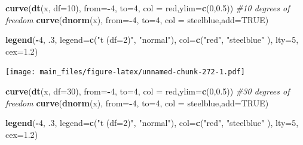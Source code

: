 \documentclass[
]{book}
\newenvironment{Shaded}{\begin{snugshade}}{\end{snugshade}}
\newcommand{\AttributeTok}[1]{\textcolor[rgb]{0.13,0.29,0.53}{#1}}
\newcommand{\CommentTok}[1]{\textcolor[rgb]{0.56,0.35,0.01}{\textit{#1}}}
\newcommand{\ConstantTok}[1]{\textcolor[rgb]{0.56,0.35,0.01}{#1}}
\newcommand{\DecValTok}[1]{\textcolor[rgb]{0.00,0.00,0.81}{#1}}
\newcommand{\FloatTok}[1]{\textcolor[rgb]{0.00,0.00,0.81}{#1}}
\newcommand{\FunctionTok}[1]{\textcolor[rgb]{0.13,0.29,0.53}{\textbf{#1}}}
\newcommand{\NormalTok}[1]{#1}
\newcommand{\SpecialCharTok}[1]{\textcolor[rgb]{0.81,0.36,0.00}{\textbf{#1}}}
\newcommand{\StringTok}[1]{\textcolor[rgb]{0.31,0.60,0.02}{#1}}
\begin{document}
\begin{Shaded}
\begin{Highlighting}[]
\FunctionTok{curve}\NormalTok{(}\FunctionTok{dt}\NormalTok{(x, }\AttributeTok{df=}\DecValTok{10}\NormalTok{), }\AttributeTok{from=}\SpecialCharTok{{-}}\DecValTok{4}\NormalTok{, }\AttributeTok{to=}\DecValTok{4}\NormalTok{, }\AttributeTok{col =} \StringTok{\textquotesingle{}red\textquotesingle{}}\NormalTok{,}\AttributeTok{ylim=}\FunctionTok{c}\NormalTok{(}\DecValTok{0}\NormalTok{,}\FloatTok{0.5}\NormalTok{)) }\CommentTok{\#10 degrees of freedom}
\FunctionTok{curve}\NormalTok{(}\FunctionTok{dnorm}\NormalTok{(x), }\AttributeTok{from=}\SpecialCharTok{{-}}\DecValTok{4}\NormalTok{, }\AttributeTok{to=}\DecValTok{4}\NormalTok{, }\AttributeTok{col =} \StringTok{\textquotesingle{}steelblue\textquotesingle{}}\NormalTok{,}\AttributeTok{add=}\ConstantTok{TRUE}\NormalTok{) }

\FunctionTok{legend}\NormalTok{(}\SpecialCharTok{{-}}\DecValTok{4}\NormalTok{, .}\DecValTok{3}\NormalTok{, }\AttributeTok{legend=}\FunctionTok{c}\NormalTok{(}\StringTok{"t (df=2)"}\NormalTok{, }\StringTok{"normal"}\NormalTok{),}
       \AttributeTok{col=}\FunctionTok{c}\NormalTok{(}\StringTok{"red"}\NormalTok{, }\StringTok{"steelblue"}\NormalTok{ ), }\AttributeTok{lty=}\DecValTok{5}\NormalTok{, }\AttributeTok{cex=}\FloatTok{1.2}\NormalTok{)}
\end{Highlighting}
\end{Shaded}

\texttt{[image: main\_files/figure-latex/unnamed-chunk-272-1.pdf]}

\begin{Shaded}
\begin{Highlighting}[]
\FunctionTok{curve}\NormalTok{(}\FunctionTok{dt}\NormalTok{(x, }\AttributeTok{df=}\DecValTok{30}\NormalTok{), }\AttributeTok{from=}\SpecialCharTok{{-}}\DecValTok{4}\NormalTok{, }\AttributeTok{to=}\DecValTok{4}\NormalTok{, }\AttributeTok{col =} \StringTok{\textquotesingle{}red\textquotesingle{}}\NormalTok{,}\AttributeTok{ylim=}\FunctionTok{c}\NormalTok{(}\DecValTok{0}\NormalTok{,}\FloatTok{0.5}\NormalTok{)) }\CommentTok{\#30 degrees of freedom}
\FunctionTok{curve}\NormalTok{(}\FunctionTok{dnorm}\NormalTok{(x), }\AttributeTok{from=}\SpecialCharTok{{-}}\DecValTok{4}\NormalTok{, }\AttributeTok{to=}\DecValTok{4}\NormalTok{, }\AttributeTok{col =} \StringTok{\textquotesingle{}steelblue\textquotesingle{}}\NormalTok{,}\AttributeTok{add=}\ConstantTok{TRUE}\NormalTok{) }

\FunctionTok{legend}\NormalTok{(}\SpecialCharTok{{-}}\DecValTok{4}\NormalTok{, .}\DecValTok{3}\NormalTok{, }\AttributeTok{legend=}\FunctionTok{c}\NormalTok{(}\StringTok{"t (df=2)"}\NormalTok{, }\StringTok{"normal"}\NormalTok{),}
       \AttributeTok{col=}\FunctionTok{c}\NormalTok{(}\StringTok{"red"}\NormalTok{, }\StringTok{"steelblue"}\NormalTok{ ), }\AttributeTok{lty=}\DecValTok{5}\NormalTok{, }\AttributeTok{cex=}\FloatTok{1.2}\NormalTok{)}
\end{Highlighting}
\end{Shaded}
\end{document}
